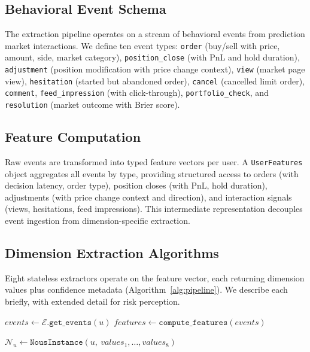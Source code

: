 \documentclass[11pt]{article}
\begin{document}
\subsection{Behavioral Event Schema}

The extraction pipeline operates on a stream of behavioral events from prediction market interactions. We define ten event types: \texttt{order} (buy/sell with price, amount, side, market category), \texttt{position\_close} (with PnL and hold duration), \texttt{adjustment} (position modification with price change context), \texttt{view} (market page view), \texttt{hesitation} (started but abandoned order), \texttt{cancel} (cancelled limit order), \texttt{comment}, \texttt{feed\_impression} (with click-through), \texttt{portfolio\_check}, and \texttt{resolution} (market outcome with Brier score).

\subsection{Feature Computation}

Raw events are transformed into typed feature vectors per user. A \texttt{UserFeatures} object aggregates all events by type, providing structured access to orders (with decision latency, order type), position closes (with PnL, hold duration), adjustments (with price change context and direction), and interaction signals (views, hesitations, feed impressions). This intermediate representation decouples event ingestion from dimension-specific extraction.

\subsection{Dimension Extraction Algorithms}

Eight stateless extractors operate on the feature vector, each returning dimension values plus confidence metadata (Algorithm~\ref{alg:pipeline}). We describe each briefly, with extended detail for risk perception.

\begin{algorithm}[t]
\caption{Nous Extraction Pipeline}
\label{alg:pipeline}

$\mathit{events} \gets \mathcal{E}.\mathtt{get\_events}(u)$\;
$\mathit{features} \gets \mathtt{compute\_features}(\mathit{events})$\;


$\mathcal{N}_u \gets \mathtt{NousInstance}(u,\ \mathit{values}_1, \ldots, \mathit{values}_8)$\;
\end{algorithm}
\end{document}
